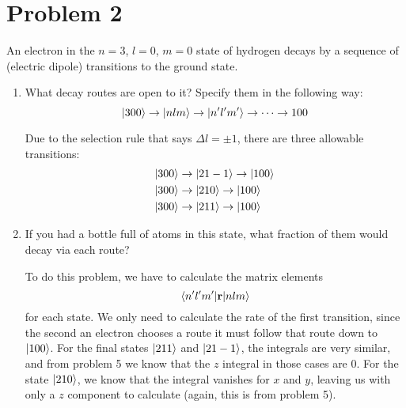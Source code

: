 \documentclass[10pt]{article}
\begin{document}
	\section*{Problem 2}
	An electron in the $n = 3$, $l = 0$, $m = 0$ state of hydrogen decays by a sequence of (electric dipole) transitions to the ground state. 
	\begin{enumerate}[label=(\alph*)]
		\item What decay routes are open to it? Specify them in the following way: 
		\[ \ket{300} \to \ket{nlm} \to \ket{n'l'm'} \to \dots \to {100}\]

		\begin{solution}
			Due to the selection rule that says $\Delta l = \pm 1$, there are three allowable transitions:
			\begin{align*}
				\ket{300} &\to \ket{2 1 -1} \to \ket{100}\\
				\ket{300} &\to \ket{2 1 0} \to \ket{100}\\
				\ket{300} &\to \ket{2 1 1} \to \ket{100}
			\end{align*}
		\end{solution}
		\item If you had a bottle full of atoms in this state, what fraction of them would decay via each route?
		
		\begin{solution}
			To do this problem, we have to calculate the matrix elements
			\[ \mel{n'l'm'}{\mathbf r}{nlm}\]
			for each state. We only need to calculate the rate of the first transition, since the second an electron chooses a route it must follow that route down to $\ket{100}$. For the final states $\ket{211}$ and $\ket{21-1}$, the integrals are very similar, and from problem 5 we know that the $z$ integral in those cases are 0. For the state $\ket{210}$, we know that the integral vanishes for $x$ and $y$, leaving us with only a $z$ component to calculate (again, this is from problem 5). 


\end{solution}
\end{enumerate}
\end{document}
